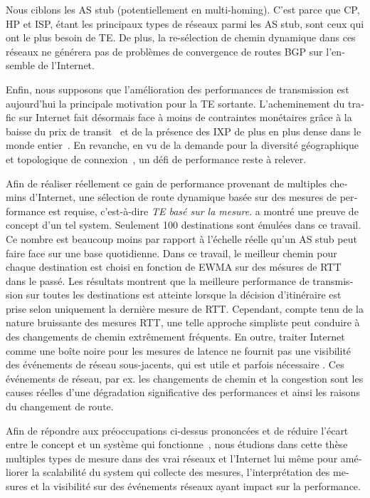 \begin{otherlanguage}{french}
Nous ciblons les \ac{AS} stub (potentiellement en multi-homing).
C'est parce que \acf{CP}, \acf{HP} et \acf{ISP}, étant les principaux types de réseaux parmi les AS stub, sont ceux qui ont le plus besoin de TE.
De plus, la re-sélection de chemin dynamique dans ces réseaux ne générera pas de problèmes de convergence de routes BGP sur l'ensemble de l'Internet.

Enfin, nous supposons que l'amélioration des performances de transmission est aujourd'hui la principale motivation pour la TE sortante.
L'acheminement du trafic sur Internet fait désormais face à moins de contraintes monétaires grâce à la baisse du prix de transit~\cite{transitprice, drpeering} 
et de la présence des \ac{IXP} de plus en plus dense dans le monde entier~\cite{pchixp}.
En revanche, en vu de la demande pour la diversité géographique et topologique de connexion~\cite{Chiu2015}, un défi de performance reste à relever.

Afin de réaliser réellement ce gain de performance provenant de multiples chemins d'Internet, 
une sélection de route dynamique basée sur des mesures de performance est requise, c'est-à-dire \textit{TE basé sur la mesure}.
\citet{Akella2008} a montré une preuve de concept d'un tel system.
Seulement 100 destinations sont émulées dans ce travail.
Ce nombre est beaucoup moins par rapport à l'échelle réelle qu'un AS stub peut faire face sur une base quotidienne.
Dans ce travail, le meilleur chemin pour chaque destination est choisi en fonction de \acf{EWMA} sur des mésures de \acf{RTT} dans le passé.
Les résultats montrent que la meilleure performance de transmission sur toutes les destinations est atteinte 
lorsque la décision d'itinéraire est prise selon uniquement la dernière mesure de \ac{RTT}.
Cependant, compte tenu de la nature bruissante des mesures \ac{RTT}, une telle approche simpliste peut conduire à des changements de chemin extrêmement fréquents.
En outre, traiter Internet comme une boîte noire pour les mesures de latence ne fournit pas une visibilité des événements de réseau sous-jacents, 
qui est utile et parfois nécessaire .
Ces événements de réseau, par ex. les changements de chemin et la congestion sont les causes réelles 
d'une dégradation significative des performances et ainsi les raisons du changement de route.

Afin de répondre aux préoccupations ci-dessus prononcées et de réduire l'écart entre le concept et un système qui fonctionne~\cite{b6},
nous étudions dans cette thèse multiples types de mesure dans des vrai réseaux et l'Internet lui même 
pour améliorer la scalabilité du system qui collecte des mesures, l'interprétation des mesures et la visibilité sur des événements réseaux ayant impact sur la performance.


\end{otherlanguage}
